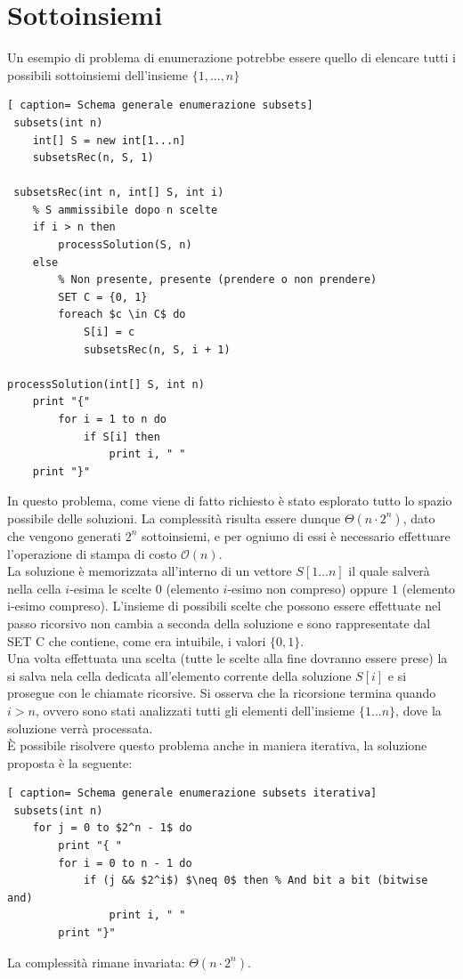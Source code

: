 \documentclass[../cheatSheetAlgoritmi.tex]{subfiles}
\begin{document}
\section{Sottoinsiemi}
Un esempio di problema di enumerazione potrebbe essere quello di elencare tutti i possibili sottoinsiemi dell'insieme $\{ 1, ..., n\}$
 \begin{lstlisting}[ caption= Schema generale enumerazione subsets]
 subsets(int n)
	int[] S = new int[1...n]
 	subsetsRec(n, S, 1) 
 	
 subsetsRec(int n, int[] S, int i)
 	% S ammissibile dopo n scelte
 	if i > n then
 		processSolution(S, n)
 	else 
 		% Non presente, presente (prendere o non prendere)
 		SET C = {0, 1}
 		foreach $c \in C$ do
 			S[i] = c
 			subsetsRec(n, S, i + 1)
 
processSolution(int[] S, int n)
	print "{"
		for i = 1 to n do
			if S[i] then
				print i, " "
	print "}"
\end{lstlisting}
In questo problema, come viene di fatto richiesto è stato esplorato tutto lo spazio possibile delle soluzioni. La complessità risulta essere dunque $\Theta(n \cdot 2^n)$, dato che vengono generati $2^n$ sottoinsiemi, e per ogniuno di essi è necessario effettuare l'operazione di stampa di costo $\mathcal{O}(n)$. \\
La soluzione è memorizzata all'interno di un vettore $S[1 ... n]$ il quale salverà nella cella $i$-esima le scelte $0$ (elemento $i$-esimo non compreso) oppure $1$ (elemento i-esimo compreso). L'insieme di possibili scelte che possono essere effettuate nel passo ricorsivo non cambia a seconda della soluzione e sono rappresentate dal SET C che contiene, come era intuibile, i valori $\{0, 1\}$. \\
Una volta effettuata una scelta (tutte le scelte alla fine dovranno essere prese) la si salva nela cella dedicata all'elemento corrente della soluzione $S[i]$ e si prosegue con le chiamate ricorsive.
Si osserva che la ricorsione termina quando $i > n$, ovvero sono stati analizzati tutti gli elementi dell'insieme $\{1...n\}$, dove la soluzione verrà processata. \\
È possibile risolvere questo problema anche in maniera iterativa, la soluzione proposta è la seguente:
 \begin{lstlisting}[ caption= Schema generale enumerazione subsets iterativa]
 subsets(int n)
	for j = 0 to $2^n - 1$ do
		print "{ "
		for i = 0 to n - 1 do
			if (j && $2^i$) $\neq 0$ then % And bit a bit (bitwise and)
				print i, " "
		print "}"
\end{lstlisting}
La complessità rimane invariata: $\Theta(n \cdot 2^n)$. 
\end{document}

